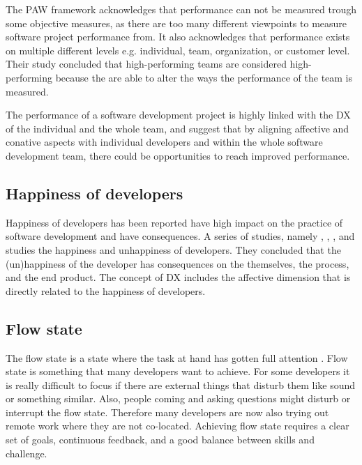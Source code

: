 \documentclass[english, 12pt, a4paper, sci, utf8, a-1b, online]{aaltothesis}
\begin{document}
The PAW framework acknowledges that performance can not be measured trough some objective measures, as there are too many different viewpoints to measure software project performance from. It also acknowledges that performance exists on multiple different levels e.g. individual, team, organization, or customer level. Their study concluded that high-performing teams are considered high-performing because the are able to alter the ways the performance of the team is measured.

The performance of a software development project is highly linked with the DX of the individual and the whole team, and \cite{how-developers-experience-team-performance} suggest that by aligning affective and conative aspects with individual developers and within the whole software development team, there could be opportunities to reach improved performance.

\subsection{Happiness of developers}

Happiness of developers has been reported have high impact on the practice of software development and have consequences. A series of studies, namely \cite{unhappy-developers}, \cite{on-the-unhappiness}, \cite{consequences-of-unhappiness}, and \cite{what-happens-when-unhappy} studies the happiness and unhappiness of developers. They concluded that the (un)happiness of the developer has consequences on the themselves, the process, and the end product. The concept of DX \citep{fagerholm-dx-concept-and-definition} includes the affective dimension that is directly related to the happiness of developers.

\subsection{Flow state}

The flow state is a state where the task at hand has gotten full attention \citep{flow-intrinsic-dx}. Flow state is something that many developers want to achieve. For some developers it is really difficult to focus if there are external things that disturb them like sound or something similar. Also, people coming and asking questions might disturb or interrupt the flow state. Therefore many developers are now also trying out remote work where they are not co-located. Achieving flow state requires a clear set of goals, continuous feedback, and a good balance between skills and challenge.
\end{document}
